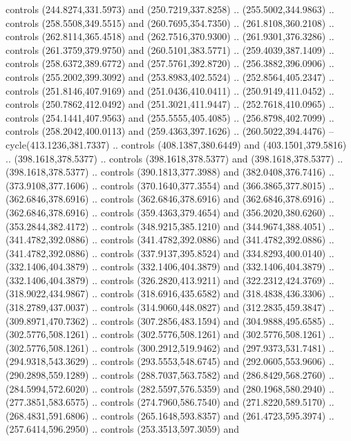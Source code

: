 \begin{scope}[shift={(69.41462,-293.94043)}]
    controls (244.8274,331.5973) and (250.7219,337.8258) .. (255.5002,344.9863) ..
    controls (258.5508,349.5515) and (260.7695,354.7350) .. (261.8108,360.2108) ..
    controls (262.8114,365.4518) and (262.7516,370.9300) .. (261.9301,376.3286) ..
    controls (261.3759,379.9750) and (260.5101,383.5771) .. (259.4039,387.1409) ..
    controls (258.6372,389.6772) and (257.5761,392.8720) .. (256.3882,396.0906) ..
    controls (255.2002,399.3092) and (253.8983,402.5524) .. (252.8564,405.2347) ..
    controls (251.8146,407.9169) and (251.0436,410.0411) .. (250.9149,411.0452) ..
    controls (250.7862,412.0492) and (251.3021,411.9447) .. (252.7618,410.0965) ..
    controls (254.1441,407.9563) and (255.5555,405.4085) .. (256.8798,402.7099) ..
    controls (258.2042,400.0113) and (259.4363,397.1626) .. (260.5022,394.4476) --
    cycle(413.1236,381.7337) .. controls (408.1387,380.6449) and
    (403.1501,379.5816) .. (398.1618,378.5377) .. controls (398.1618,378.5377) and
    (398.1618,378.5377) .. (398.1618,378.5377) .. controls (390.1813,377.3988) and
    (382.0408,376.7416) .. (373.9108,377.1606) .. controls (370.1640,377.3554) and
    (366.3865,377.8015) .. (362.6846,378.6916) .. controls (362.6846,378.6916) and
    (362.6846,378.6916) .. (362.6846,378.6916) .. controls (359.4363,379.4654) and
    (356.2020,380.6260) .. (353.2844,382.4172) .. controls (348.9215,385.1210) and
    (344.9674,388.4051) .. (341.4782,392.0886) .. controls (341.4782,392.0886) and
    (341.4782,392.0886) .. (341.4782,392.0886) .. controls (337.9137,395.8524) and
    (334.8293,400.0140) .. (332.1406,404.3879) .. controls (332.1406,404.3879) and
    (332.1406,404.3879) .. (332.1406,404.3879) .. controls (326.2820,413.9211) and
    (322.2312,424.3769) .. (318.9022,434.9867) .. controls (318.6916,435.6582) and
    (318.4838,436.3306) .. (318.2789,437.0037) .. controls (314.9060,448.0827) and
    (312.2835,459.3847) .. (309.8971,470.7362) .. controls (307.2856,483.1594) and
    (304.9888,495.6585) .. (302.5776,508.1261) .. controls (302.5776,508.1261) and
    (302.5776,508.1261) .. (302.5776,508.1261) .. controls (300.2912,519.9462) and
    (297.9373,531.7481) .. (294.9318,543.3629) .. controls (293.5553,548.6745) and
    (292.0605,553.9606) .. (290.2898,559.1289) .. controls (288.7037,563.7582) and
    (286.8429,568.2760) .. (284.5994,572.6020) .. controls (282.5597,576.5359) and
    (280.1968,580.2940) .. (277.3851,583.6575) .. controls (274.7960,586.7540) and
    (271.8220,589.5170) .. (268.4831,591.6806) .. controls (265.1648,593.8357) and
    (261.4723,595.3974) .. (257.6414,596.2950) .. controls (253.3513,597.3059) and

\end{scope}
